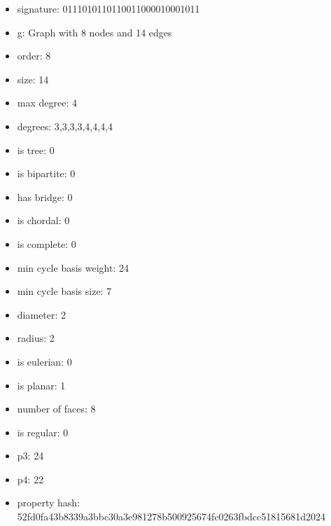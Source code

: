 \begin{itemize}
\item signature: 0111010110110011000010001011
\item g: Graph with 8 nodes and 14 edges
\item order: 8
\item size: 14
\item max degree: 4
\item degrees: 3,3,3,3,4,4,4,4
\item is tree: 0
\item is bipartite: 0
\item has bridge: 0
\item is chordal: 0
\item is complete: 0
\item min cycle basis weight: 24
\item min cycle basis size: 7
\item diameter: 2
\item radius: 2
\item is eulerian: 0
\item is planar: 1
\item number of faces: 8
\item is regular: 0
\item p3: 24
\item p4: 22
\item property hash: 52fd0fa43b8339a3bbc30a3e981278b500925674fc0263fbdcc51815681d2024
\end{itemize}
\newpage
\begin{figure}
\end{figure}
